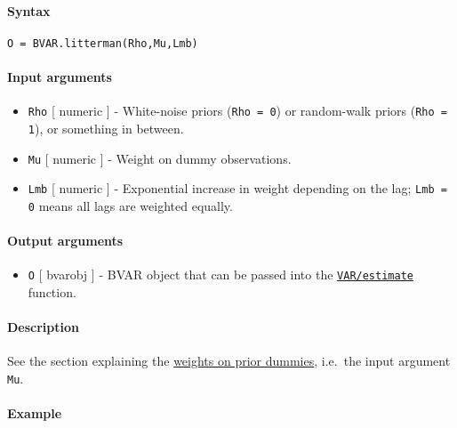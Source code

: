 


	\paragraph{Syntax}

\begin{verbatim}
O = BVAR.litterman(Rho,Mu,Lmb)
\end{verbatim}

\paragraph{Input arguments}

\begin{itemize}
\item
  \texttt{Rho} {[} numeric {]} - White-noise priors (\texttt{Rho = 0})
  or random-walk priors (\texttt{Rho = 1}), or something in between.
\item
  \texttt{Mu} {[} numeric {]} - Weight on dummy observations.
\item
  \texttt{Lmb} {[} numeric {]} - Exponential increase in weight
  depending on the lag; \texttt{Lmb = 0} means all lags are weighted
  equally.
\end{itemize}

\paragraph{Output arguments}

\begin{itemize}
\itemsep1pt\parskip0pt
\item
  \texttt{O} {[} bvarobj {]} - BVAR object that can be passed into the
  \href{VAR/estimate}{\texttt{VAR/estimate}} function.
\end{itemize}

\paragraph{Description}

See the section explaining the \href{BVAR/Contents}{weights on prior
dummies}, i.e.~the input argument \texttt{Mu}.

\paragraph{Example}


